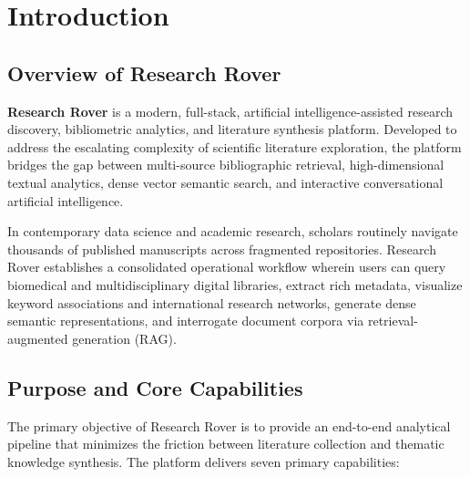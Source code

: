 \section{Introduction}
\label{sec:introduction}

\subsection{Overview of Research Rover}
\textbf{Research Rover} is a modern, full-stack, artificial intelligence-assisted research discovery, bibliometric analytics, and literature synthesis platform. Developed to address the escalating complexity of scientific literature exploration, the platform bridges the gap between multi-source bibliographic retrieval, high-dimensional textual analytics, dense vector semantic search, and interactive conversational artificial intelligence.

In contemporary data science and academic research, scholars routinely navigate thousands of published manuscripts across fragmented repositories. Research Rover establishes a consolidated operational workflow wherein users can query biomedical and multidisciplinary digital libraries, extract rich metadata, visualize keyword associations and international research networks, generate dense semantic representations, and interrogate document corpora via retrieval-augmented generation (RAG).

\subsection{Purpose and Core Capabilities}
The primary objective of Research Rover is to provide an end-to-end analytical pipeline that minimizes the friction between literature collection and thematic knowledge synthesis. The platform delivers seven primary capabilities:

